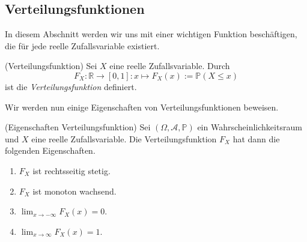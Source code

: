 \subsection{Verteilungsfunktionen}

In diesem Abschnitt werden wir uns mit einer wichtigen Funktion beschäftigen, die für jede reelle Zufallsvariable existiert.

\begin{Definition}{(Verteilungsfunktion)}
Sei $X$ eine reelle Zufallsvariable. Durch 
\[F_X: \mathbb{R} \rightarrow [0, 1]: x \mapsto F_X(x) := \mathbb{P}(X \leq x)\]
ist die \textit{Verteilungsfunktion} definiert.
\end{Definition}

Wir werden nun einige Eigenschaften von Verteilungsfunktionen beweisen.

\begin{Satz}{(Eigenschaften Verteilungsfunktion)}
\hypertarget{Satz:EigVertFun}{}Sei $(\Omega, \mathscr{A}, \mathbb{P})$ ein Wahrscheinlichkeitsraum und $X$ eine reelle Zufallsvariable. Die Verteilungsfunktion $F_X$ hat dann die folgenden Eigenschaften.
\begin{enumerate}[label=\textup{(\roman*)}]
\item $F_X$ ist rechtsseitig stetig.
\item $F_X$ ist monoton wachsend.
\item $\lim_{x \rightarrow -\infty} F_X(x) = 0$.
\item $\lim_{x \rightarrow \infty} F_X(x) = 1$.
\end{enumerate}
\end{Satz}

\newpage

